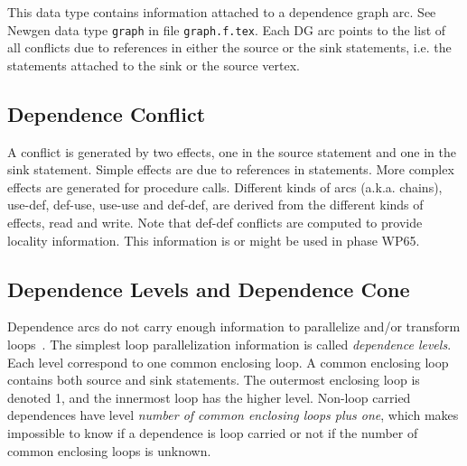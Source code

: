 {}

This data type contains information attached to a dependence graph arc.
See Newgen data type \verb/graph/ in file \verb/graph.f.tex/. Each DG arc
points to the list of all conflicts due to references in either the
source or the sink statements, i.e. the statements attached to the sink
or the source vertex.

\begin{comment}
Ce domaine est utilise' pour contenir les informations qui sont
attache'es a` chaque arc du graphe de de'pendances (voir le domaine {\tt
graph} dans le fichier {\tt graph.f.tex}). Chaque arc du GD contient les
conflits entre les deux statements des noeuds du graphe de de'pendance.
\end{comment}

\subsection{Dependence Conflict}

{}

A conflict is generated by two effects, one in the source statement and
one in the sink statement. Simple effects are due to references in
statements. More complex effects are generated for procedure
calls. Different kinds of arcs (a.k.a. chains), use-def, def-use,
use-use and def-def, are derived from the different kinds of effects,
read and write. Note that def-def conflicts are computed to provide
locality information. This information is or might be used in phase WP65.

\begin{comment}
Un conflit existe entre deux effets pre'sents dans deux noeuds voisins
du graphe de de'pendance. Les types d'effet (write, read) sert a`
distinguer les conflits ``use-def'', ``def-def'' et ``{def-use}''. Le
cone comprend les informations precises de conflict.
\end{comment}

\subsection{Dependence Levels and Dependence Cone}

{}

Dependence arcs do not carry enough information to parallelize and/or
transform loops~\cite{YAI95}. The simplest loop parallelization
information is called {\em dependence levels}. Each level correspond to
one common enclosing loop. A common enclosing loop contains both source
and sink statements. The outermost enclosing loop is denoted 1, and the
innermost loop has the higher level. Non-loop carried dependences have
level {\em number of common enclosing loops plus one}, which makes
impossible to know if a dependence is loop carried or not if the number of
common enclosing loops is unknown.

